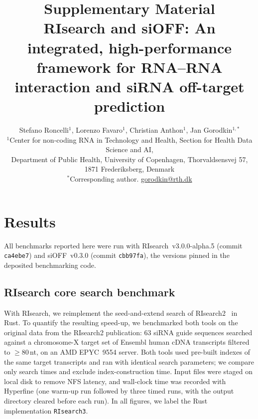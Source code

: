 \documentclass[11pt]{article}
\title{Supplementary Material\\[4pt]
  \large RIsearch and siOFF: An integrated, high-performance framework
  for RNA--RNA interaction and siRNA off-target prediction}
\author{Stefano Roncelli$^{1}$, Lorenzo Favaro$^{1}$, Christian Anthon$^{1}$, Jan Gorodkin$^{1,\ast}$\\[6pt]
  \small $^{1}$Center for non-coding RNA in Technology and Health, Section for Health Data Science and AI,\\
  \small Department of Public Health, University of Copenhagen, Thorvaldsensvej 57, 1871 Frederiksberg, Denmark\\[2pt]
  \small $^{\ast}$Corresponding author. \href{mailto:gorodkin@rth.dk}{gorodkin@rth.dk}}
\date{}
\begin{document}
\maketitle
\thispagestyle{plain}

\setcounter{figure}{0}
\renewcommand{\thefigure}{S\arabic{figure}}
\setcounter{table}{0}
\renewcommand{\thetable}{S\arabic{table}}
\setcounter{section}{0}
\renewcommand{\thesection}{S\arabic{section}}

\section{Results}\label{sec:results}

All benchmarks reported here were run with RIsearch~v3.0.0-alpha.5 (commit \texttt{ca4ebe7}) and siOFF~v0.3.0 (commit \texttt{cbb97fa}), the versions pinned in the deposited benchmarking code.


\subsection{RIsearch core search benchmark}\label{sec:risearch-benchmark}
With RIsearch, we reimplement the seed-and-extend search of RIsearch2~\citep{alkan2017risearch2} in Rust.
To quantify the resulting speed-up, we benchmarked both tools on the original data from the RIsearch2 publication: 63 siRNA guide sequences searched against a chromosome-X target set of Ensembl human cDNA transcripts filtered to $\geq 80$\,nt, on an AMD EPYC~9554 server.
Both tools used pre-built indexes of the same target transcripts and ran with identical search parameters; we compare only search times and exclude index-construction time.
Input files were staged on local disk to remove NFS latency, and wall-clock time was recorded with Hyperfine (one warm-up run followed by three timed runs, with the output directory cleared before each run).
In all figures, we label the Rust implementation \texttt{RIsearch3}.
\end{document}
